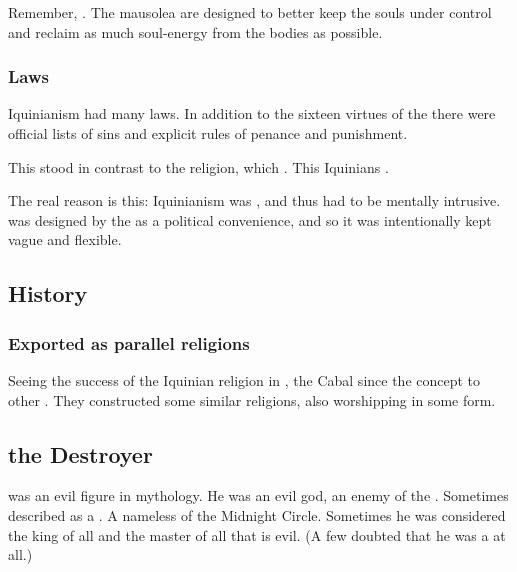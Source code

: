 Remember, . 
The mausolea are designed to better keep the souls under control and reclaim as much soul-energy from the bodies as possible. 





\subsubsection{Laws}
Iquinianism had many laws. 
In addition to the sixteen virtues of the \sephiroth there were official lists of sins and explicit rules of penance and punishment. 

This stood in contrast to the \Ortaican religion, which . 
This Iquinians . 

The real reason is this: 
Iquinianism was , and thus had to be mentally intrusive. 
\Ortaicanism was designed by the \taorthae as a political convenience, and so it was intentionally kept vague and flexible. 










\subsection{History}





\subsubsection{Exported as parallel religions}
Seeing the success of the Iquinian religion in \Azmith, the Cabal since  the concept to other . 
They constructed some similar religions, also worshipping \iquin{} in some form. 









\subsection{\Isphet the Destroyer}
\index{\Isphet}
\Isphet was an evil figure in \Iquinian mythology. 
He was an evil god, an enemy of the \sephiroth. 
Sometimes described as a \qliphah. 
A nameless \qliphah of the Midnight Circle. 
Sometimes he was considered the king of all \qliphoth and the master of all that is evil. 
(A few doubted that he was a \qliphah at all.)

